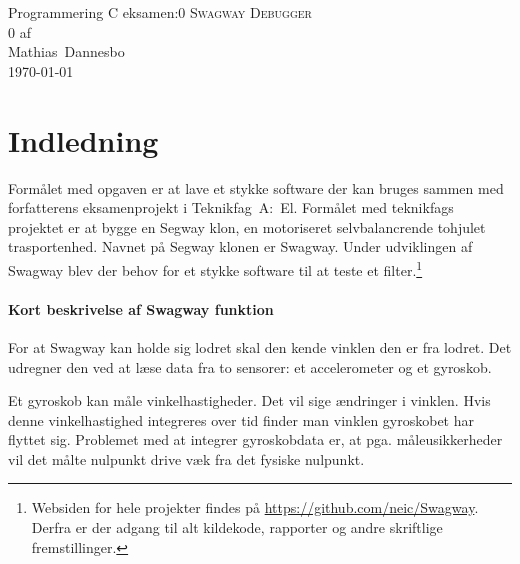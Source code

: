 \documentclass[a4paper,oneside,article,danish,table]{memoir}
\newcommand{\authorvar}{Mathias~Dannesbo}
\newcommand{\pretitlevar}{Programmering C eksamen:}
\newcommand{\titlevar}{Swagway Debugger}
\newcommand{\subtitlevar}{0}
\newcommand{\datevar}{\today}
\begin{document}

\begin{center}
  \if\pretitlevar 0
  \else{\Large\pretitlevar\\} \fi
  \textsc{\HUGE\titlevar\\}
  \if\subtitlevar 0
  \else {\Large\subtitlevar\\} \fi
  {\LARGE 
  af\\
   \authorvar}\\
 \datevar\\
\end{center}
\begin{abstract}
  This journal is a walk-thorugh of the source code of Swagway Debugger, a Windows application for debugging and tuning filters, e.g. Kalman-filters, on balancing robots and Segway clones. It is made as a part of the Swagway project.
\end{abstract}
\thispagestyle{empty}

\chapter{Indledning}
Formålet med opgaven er at lave et stykke software der kan bruges sammen med forfatterens eksamenprojekt i Teknikfag~A:~El. Formålet med teknikfags projektet er at bygge en Segway klon, en motoriseret selvbalancrende tohjulet trasportenhed. Navnet på Segway klonen er Swagway. Under udviklingen af Swagway blev der behov for et stykke software til at teste et filter.\footnote{Websiden for hele projekter findes på \url{https://github.com/neic/Swagway}. Derfra er der adgang til alt kildekode, rapporter og andre skriftlige fremstillinger.}

\subsubsection{Kort beskrivelse af Swagway funktion}
For at Swagway kan holde sig lodret skal den kende vinklen den er fra lodret. Det udregner den ved at læse data fra to sensorer: et accelerometer og et gyroskob.

Et gyroskob kan måle vinkelhastigheder. Det vil sige ændringer i vinklen. Hvis denne vinkelhastighed integreres over tid finder man vinklen gyroskobet har flyttet sig. Problemet med at integrer gyroskobdata er, at pga. måleusikkerheder vil det målte nulpunkt drive væk fra det fysiske nulpunkt.
\end{document}
